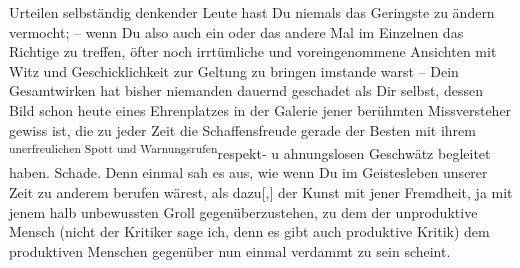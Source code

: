                Urteilen selbständig denkender Leute hast Du niemals das Geringste zu ändern
               vermocht; – wenn Du also auch ein oder das andere Mal im Einzelnen das Richtige zu
               treffen, öfter noch irrtümliche und voreingenommene Ansichten mit Witz und
               Geschicklichkeit zur Geltung zu bringen imstande warst – Dein Gesamtwirken hat bisher
               niemanden dauernd geschadet als Dir selbst, dessen Bild schon heute eines
               Ehrenplatzes in der Galerie jener berühmten Missversteher gewiss ist, die zu jeder
               Zeit die Schaffensfreude gerade der Besten mit ihrem \substVorne{}\textsuperscript{unerfreulichen Spott und Warnungsrufen}\substDazwischen{}respekt- u ahnungslosen Geschwätz\substHinten{} begleitet haben. Schade. Denn einmal sah es aus, wie wenn Du im Geistesleben
               unserer Zeit zu anderem berufen wärest, als
                  dazu{[},{]} der Kunst mit jener
               Fremdheit, ja mit jenem halb unbewussten Groll gegenüberzustehen, zu dem der
               unproduktive Mensch (nicht der Kritiker sage ich, denn es gibt auch produktive
               Kritik) dem produktiven Menschen gegenüber nun einmal verdammt zu {\pb}sein scheint.\pend
           
